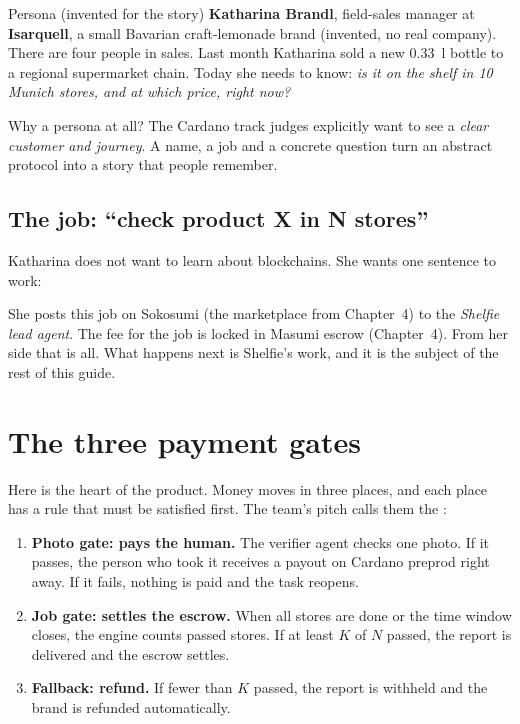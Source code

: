 \begin{shelfiebox}{Persona (invented for the story)}
\textbf{Katharina Brandl}, field-sales manager at \textbf{Isarquell}, a small Bavarian craft-lemonade brand (invented, no real company). There are four people in sales. Last month Katharina sold a new 0.33~l bottle to a regional supermarket chain. Today she needs to know: \emph{is it on the shelf in 10 Munich stores, and at which price, right now?}
\end{shelfiebox}

Why a persona at all? The Cardano track judges explicitly want to see a \emph{clear customer and journey}. A name, a job and a concrete question turn an abstract protocol into a story that people remember.

\subsection{The job: ``check product X in N stores''}
Katharina does not want to learn about blockchains. She wants one sentence to work:

\begin{center}
\end{center}

She posts this job on Sokosumi (the marketplace from Chapter~4) to the \emph{Shelfie lead agent}. The fee for the job is locked in Masumi escrow (Chapter~4). From her side that is all. What happens next is Shelfie's work, and it is the subject of the rest of this guide.

\section{The three payment gates}
Here is the heart of the product. Money moves in three places, and each place has a rule that must be satisfied first. The team's pitch calls them the :

\begin{enumerate}
  \item \textbf{Photo gate: pays the human.} The verifier agent checks one photo. If it passes, the person who took it receives a payout on Cardano preprod right away. If it fails, nothing is paid and the task reopens.
  \item \textbf{Job gate: settles the escrow.} When all stores are done or the time window closes, the engine counts passed stores. If at least $K$ of $N$ passed, the report is delivered and the escrow settles.
  \item \textbf{Fallback: refund.} If fewer than $K$ passed, the report is withheld and the brand is refunded automatically.
\end{enumerate}

